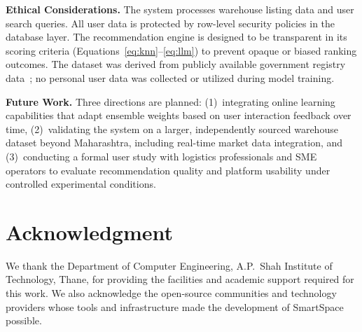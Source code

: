 \documentclass[pdflatex,sn-mathphys-num]{sn-jnl}
\theoremstyle{thmstyleone}
\theoremstyle{thmstyletwo}
\theoremstyle{thmstylethree}
\begin{document}
\textbf{Ethical Considerations.} The system processes warehouse listing data and user search queries. All user data is protected by row-level security policies in the database layer. The recommendation engine is designed to be transparent in its scoring criteria (Equations~\ref{eq:knn}--\ref{eq:llm}) to prevent opaque or biased ranking outcomes. The dataset was derived from publicly available government registry data~\cite{b14}; no personal user data was collected or utilized during model training.

\textbf{Future Work.} Three directions are planned: (1)~integrating online learning capabilities that adapt ensemble weights based on user interaction feedback over time, (2)~validating the system on a larger, independently sourced warehouse dataset beyond Maharashtra, including real-time market data integration, and (3)~conducting a formal user study with logistics professionals and SME operators to evaluate recommendation quality and platform usability under controlled experimental conditions.


\section*{Acknowledgment}

We thank the Department of Computer Engineering, A.P.~Shah Institute of Technology, Thane, for providing the facilities and academic support required for this work. We also acknowledge the open-source communities and technology providers whose tools and infrastructure made the development of SmartSpace possible.

\end{document}
